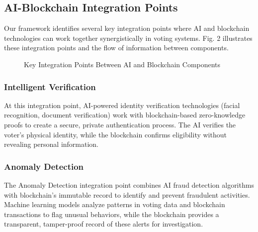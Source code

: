 \documentclass[conference]{IEEEtran}
\begin{document}
\subsection{AI-Blockchain Integration Points}
Our framework identifies several key integration points where AI and blockchain technologies can work together synergistically in voting systems. Fig. 2 illustrates these integration points and the flow of information between components.

\begin{figure}[!h]
\centering
{}
\caption{Key Integration Points Between AI and Blockchain Components}
\label{fig:integration}
\end{figure}

\subsubsection{Intelligent Verification}
At this integration point, AI-powered identity verification technologies (facial recognition, document verification) work with blockchain-based zero-knowledge proofs to create a secure, private authentication process. The AI verifies the voter's physical identity, while the blockchain confirms eligibility without revealing personal information.

\subsubsection{Anomaly Detection}
The Anomaly Detection integration point combines AI fraud detection algorithms with blockchain's immutable record to identify and prevent fraudulent activities. Machine learning models analyze patterns in voting data and blockchain transactions to flag unusual behaviors, while the blockchain provides a transparent, tamper-proof record of these alerts for investigation.
\end{document}

